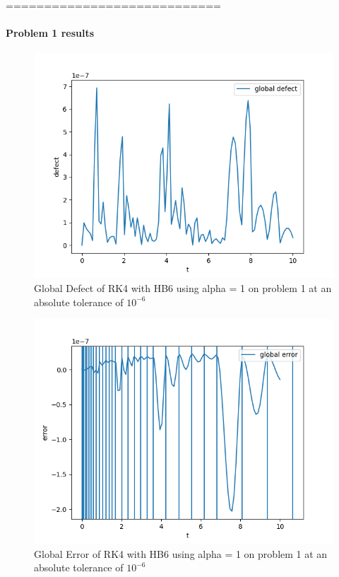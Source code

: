 \documentclass{article}
\begin{document}
============================
\paragraph{Problem 1 results}
\begin{figure}[H]
\centering
\includegraphics[width=0.7\linewidth]{./figures/static_alpha_rk4_with_hb6_p1_global_defect}
\caption{Global Defect of RK4 with HB6 using alpha = 1 on problem 1 at an absolute tolerance of $10^{-6}$}
\label{fig:static_alpha_rk4_with_hb6_p1_global_defect}
\end{figure}

\begin{figure}[H]
\centering
\includegraphics[width=0.7\linewidth]{./figures/static_alpha_rk4_with_hb6_p1_global_error}
\caption{Global Error of RK4 with HB6 using alpha = 1 on problem 1 at an absolute tolerance of $10^{-6}$}
\label{fig:static_alpha_rk4_with_hb6_p1_global_error}
\end{figure}
\end{document}
